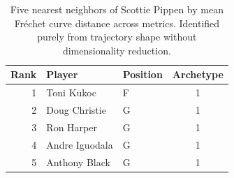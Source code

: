 \begin{table}[htbp]
  \centering\small
  \begin{tabular}{rllc}
    \toprule
    Rank & Player & Position & Archetype \\
    \midrule
    1 & Toni Kukoc & F & 1 \\
    2 & Doug Christie & G & 1 \\
    3 & Ron Harper & G & 1 \\
    4 & Andre Iguodala & G & 1 \\
    5 & Anthony Black & G & 1 \\
    \bottomrule
  \end{tabular}
  \caption{Five nearest neighbors of Scottie Pippen by mean Fr\'{e}chet curve distance across metrics. Identified purely from trajectory shape without dimensionality reduction.}
  \label{tab:Scottie_Pippen_frechet_curve_neighbors}
\end{table}

